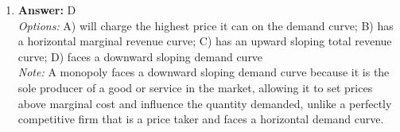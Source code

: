 \documentclass[12pt]{article}
\begin{document}
\begin{enumerate}[label=\arabic*.]
\\ \textit{Note:} The value placed on the owner's skills in an alternative career is an implicit cost because it represents the foregone income the owner could have earned by pursuing a different job, reflecting the opportunity cost of their current business decision.
\item \textbf{Answer:} D
\\ \textit{Options:} A) will charge the highest price it can on the demand curve; B) has a horizontal marginal revenue curve; C) has an upward sloping total revenue curve; D) faces a downward sloping demand curve
\\ \textit{Note:} A monopoly faces a downward sloping demand curve because it is the sole producer of a good or service in the market, allowing it to set prices above marginal cost and influence the quantity demanded, unlike a perfectly competitive firm that is a price taker and faces a horizontal demand curve.
\end{enumerate}
\end{document}
